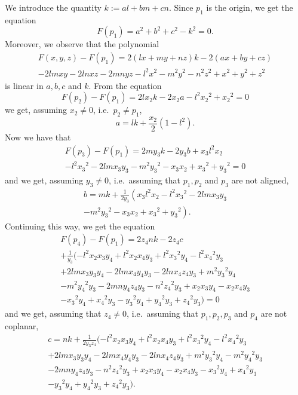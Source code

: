 \documentclass[5p]{elsarticle}
\newcommand{\com}[1]{{\color{black} #1}}
\begin{document}
We introduce the quantity $k:=al+bm+cn$. Since $p_1$ is the origin, we get the equation
\begin{equation}\label{eq:F0}
F(p_1)=a^2+b^2+c^2-k^2=0.	
\end{equation}
Moreover, we observe that the polynomial
\begin{multline}\label{eq:F-F1}
F(x,y,z)-F(p_1)=
 2\left( lx+my+nz \right) k -2(ax+by+cz) \\
 -2lmxy-2lnxz-2mnyz
 -{l}^{2}{x}^{2}-{m}^{2}{y}^{2}-{n}^{2}{z}^{2}+{x}^{2}+{y}^{2}+{z}^{2}	
\end{multline}
is linear in $a,b,c$ and $k$. From the equation
$$F(p_2)-F(p_1)=
2l{ x_2}k-2{ x_2}a-{l}^{2}{{ x_2}}^{2}+{{ x_2}}^{2}=0$$
we get, assuming $x_2\neq 0$, i.e.~$p_2\neq p_1$,
\begin{equation}\label{eq:a}
a=lk+ \frac{x_2}{2}(1-l^2).	
\end{equation}
Now we have that
\begin{multline*}
F(p_3)-F(p_1)= 
2m{y_3}k-2{y_3}b 
+{x_3}{l}^{2}{x_2} \\ -{l}^{2}{{x_3}}^{2}-2lm{x_3}{y_3}
-{m}^{2}{{y_3}}^{2}-{x_3}{x_2}
+{{x_3}}^{2}+{{y_3}}^{2} =0	
\end{multline*}
and we get, assuming $y_3\neq 0$, i.e.~assuming that $p_1,p_2$ and $p_3$ are not aligned,
\begin{multline}\label{eq:b}
b=
mk+ \frac{1}{2y_3}
\left(
{x_3}{l}^{2}{x_2}-{l}^{2}{{x_3}}^{2}-2lm{x_3}{y_3} \right. \\
\left. -{m}^{2}{{y_3}}^{2}-{x_3}{x_2}+{{x_3}}^{2}+
{{y_3}}^{2}
\right).	
\end{multline}
Continuing this way, we get the equation
\begin{multline*}
F(p_4)-F(p_1)= 2 { z_4}nk -2 { z_4} c  \\
+ \frac{1}{y_3}(
-{l}^{2}{ x_2} { x_3} { y_4}+{l}^{2}{ x_2} { x_4} { 
y_3}+{l}^{2}{{ x_3}}^{2}{ y_4}-{l}^{2}{{ x_4}}^{2}{ y_3} \\ 
+2 lm{
 x_3} { y_3} { y_4}-2 lm{ x_4} { y_4} { y_3}-2 ln{
 x_4} { z_4} { y_3} +{m}^{2}{{ y_3}}^{2}{ y_4} \\
 -{m}^{2}{{
 y_4}}^{2}{ y_3}-2 mn{ y_4} { z_4} { y_3}-{n}^{2}{{ z_4
}}^{2}{ y_3} 
+{ x_2}
 { x_3} { y_4}-{ x_2} { x_4} { y_3} \\
 -{{ x_3}}^{2}{ 
y_4}+{{ x_4}}^{2}{ y_3}-{{ y_3}}^{2}{ y_4}+{{ y_4}}^{2}{ 
y_3}+{{ z_4}}^{2}{ y_3})
=0	
\end{multline*}
\com{and we get}, assuming that $z_4\neq 0$, i.e.~assuming that $p_1,p_2,p_3$ and $p_4$ are not coplanar,
\begin{multline}\label{eq:c}
c= nk +
\frac{1}{2y_3z_4} ( 
-{l}^{2}{  x_2} {  x_3} {  y_4}+{l}^{2}{  x_2} {  x_4} {  
y_3}+{l}^{2}{{  x_3}}^{2}{  y_4}-{l}^{2}{{  x_4}}^{2}{  y_3} \\
+2 lm{
  x_3} {  y_3} {  y_4}-2 lm{  x_4} {  y_4} {  y_3}-2 ln{
  x_4} {  z_4} {  y_3} 
  +{m}^{2}{{  y_3}}^{2}{  y_4}-{m}^{2}{{
  y_4}}^{2}{  y_3} \\ -2 mn{  y_4} {  z_4} {  y_3}-{n}^{2}{{  z_4
}}^{2}{  y_3}+{  x_2} {  x_3} {  y_4}-{
  x_2} {  x_4} {  y_3}-{{  x_3}}^{2}{  y_4}+{{  x_4}}^{2}{  
y_3} \\ -{{  y_3}}^{2}{  y_4}+{{  y_4}}^{2}{  y_3}+{{  z_4}}^{2}{  
y_3}
).
\end{multline}
\end{document}
